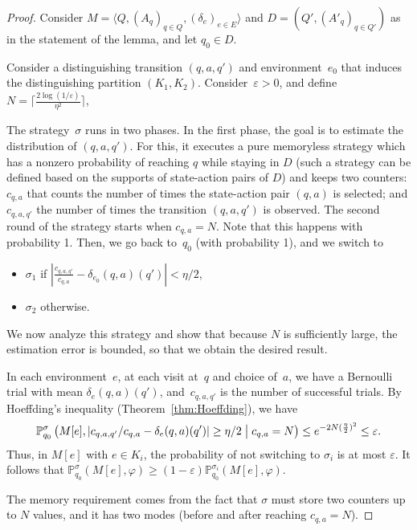 \documentclass[a4paper,USenglish,cleveref, autoref, thm-restate]{lipics-v2021}
\let\epsilon\varepsilon
\newcommand{\tuple}[1]{\langle #1 \rangle}
\newcommand*{\pr}{\mathbb{P}}
\begin{document}
\begin{proof}
	Consider $M=\tuple{Q,(A_q)_{q \in Q}, (\delta_e)_{e \in E}}$ and $D = (Q',(A'_q)_{q \in Q'})$ as in the statement of the lemma,
	and let $q_0 \in D$. 
        
	Consider a distinguishing transition $(q,a,q')$ and environment~$e_0$ that induces the distinguishing partition $(K_1,K_2)$.
	Consider~$\epsilon>0$, and define~$N = \lceil\frac{2\log(1/\epsilon)}{\eta^2}\rceil$,

	The strategy~$\sigma$ runs in two phases. In the first phase, the
	goal is to estimate the distribution of $(q,a,q')$. For this, it executes
	a pure memoryless strategy which has a nonzero probability of reaching $q$
	while staying in $D$ (such a strategy can be defined based on the supports of state-action pairs of $D$)
	and keeps two counters: $c_{q,a}$ that counts the number of times the state-action pair $(q,a)$ is selected;
	and $c_{q,a,q'}$ the number of times the transition $(q,a,q')$ is observed.
	The second round of the strategy starts when $c_{q,a} = N$. Note that this happens with probability 1.
	Then, we go back to~$q_0$ (with probability 1), and we switch to 
	\begin{itemize}
		\item $\sigma_1$ if $\left\lvert\frac{c_{q,a,q'}}{c_{q,a}} - \delta_{e_0}(q,a)(q')\right\rvert < \eta/2$,
		\item $\sigma_2$ otherwise.
	\end{itemize}
	We now analyze this strategy and show that because $N$ is sufficiently large, 
	the estimation error is bounded, so that we obtain the desired result.
	
	In each environment~$e$, at each visit at~$q$ and choice of~$a$, we have a
	Bernoulli trial with mean $\delta_e(q,a)(q')$, and~$c_{q,a,q'}$ is the
	number of successful trials.
	By Hoeffding's inequality (Theorem~\ref{thm:Hoeffding}), we have
	\[
		\pr_{q_0}^{\sigma}\left(M[e], \left\lvert c_{q,a,q'}/c_{q,a} - \delta_e(q,a)(q')\right\rvert \geq 
		\eta/2 \bigm\vert c_{q,a} = N \right)
		\leq e^{-2N(\frac{\eta}{2})^2} \leq \epsilon.
	\]
	Thus, in $M[e]$ with $e \in K_i$, the probability of not switching to $\sigma_i$ is at most $\epsilon$.
	It follows that $\pr_{q_0}^{\sigma}(M[e],\varphi) \geq (1-\epsilon)\pr_{q_0}^{\sigma_i}(M[e], \varphi)$.

	The memory requirement comes from the fact that $\sigma$ must store two counters up to $N$ values, and it has two modes
	(before and after reaching $c_{q,a} = N$).
	\end{proof}
\end{document}

